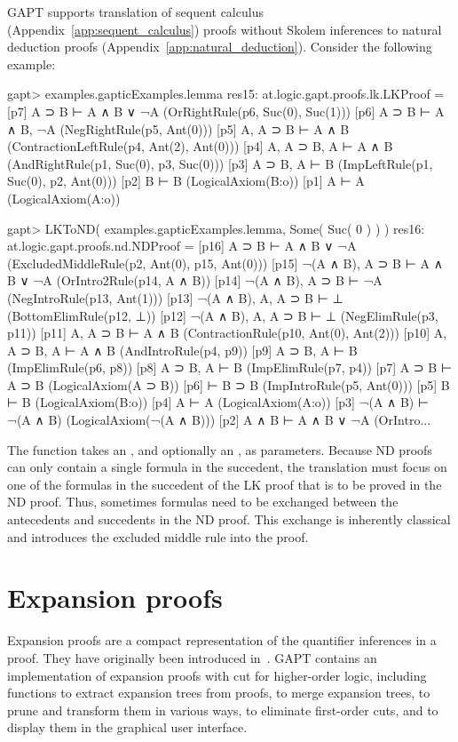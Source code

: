 \documentclass[a4paper,11pt]{book}
\newcommand{\cli}[1]{{\ttfamily {#1}}}
\begin{document}
GAPT supports translation of sequent calculus
(Appendix~\ref{app:sequent_calculus}) proofs without Skolem inferences
to natural deduction proofs (Appendix~\ref{app:natural_deduction}).
Consider the following example:
\begin{clilisting}
gapt> examples.gapticExamples.lemma
res15: at.logic.gapt.proofs.lk.LKProof =
[p7] A ⊃ B ⊢ A ∧ B ∨ ¬A    (OrRightRule(p6, Suc(0), Suc(1)))
[p6] A ⊃ B ⊢ A ∧ B, ¬A    (NegRightRule(p5, Ant(0)))
[p5] A, A ⊃ B ⊢ A ∧ B    (ContractionLeftRule(p4, Ant(2), Ant(0)))
[p4] A, A ⊃ B, A ⊢ A ∧ B    (AndRightRule(p1, Suc(0), p3, Suc(0)))
[p3] A ⊃ B, A ⊢ B    (ImpLeftRule(p1, Suc(0), p2, Ant(0)))
[p2] B ⊢ B    (LogicalAxiom(B:o))
[p1] A ⊢ A    (LogicalAxiom(A:o))

gapt> LKToND( examples.gapticExamples.lemma, Some( Suc( 0 ) ) )
res16: at.logic.gapt.proofs.nd.NDProof =
[p16] A ⊃ B ⊢ A ∧ B ∨ ¬A    (ExcludedMiddleRule(p2, Ant(0), p15, Ant(0)))
[p15] ¬(A ∧ B), A ⊃ B ⊢ A ∧ B ∨ ¬A    (OrIntro2Rule(p14, A ∧ B))
[p14] ¬(A ∧ B), A ⊃ B ⊢ ¬A    (NegIntroRule(p13, Ant(1)))
[p13] ¬(A ∧ B), A, A ⊃ B ⊢ ⊥    (BottomElimRule(p12, ⊥))
[p12] ¬(A ∧ B), A, A ⊃ B ⊢ ⊥    (NegElimRule(p3, p11))
[p11] A, A ⊃ B ⊢ A ∧ B    (ContractionRule(p10, Ant(0), Ant(2)))
[p10] A, A ⊃ B, A ⊢ A ∧ B    (AndIntroRule(p4, p9))
[p9] A ⊃ B, A ⊢ B    (ImpElimRule(p6, p8))
[p8] A ⊃ B, A ⊢ B    (ImpElimRule(p7, p4))
[p7] A ⊃ B ⊢ A ⊃ B    (LogicalAxiom(A ⊃ B))
[p6]  ⊢ B ⊃ B    (ImpIntroRule(p5, Ant(0)))
[p5] B ⊢ B    (LogicalAxiom(B:o))
[p4] A ⊢ A    (LogicalAxiom(A:o))
[p3] ¬(A ∧ B) ⊢ ¬(A ∧ B)    (LogicalAxiom(¬(A ∧ B)))
[p2] A ∧ B ⊢ A ∧ B ∨ ¬A    (OrIntro...

\end{clilisting}
The \cli{LKToND} function takes an \cli{LKProof}, and optionally an
\cli{Option[SequentIndex]}, as parameters.  Because ND proofs can only
contain a single formula in the succedent, the translation must focus on one
of the formulas in the succedent of the LK proof that is to be proved in the ND
proof.
Thus, sometimes formulas need to be exchanged between the antecedents and
succedents in the ND proof. This exchange is inherently classical and introduces
the excluded middle rule into the proof.

\section{Expansion proofs}

Expansion proofs are a compact representation of the quantifier inferences in a
proof.  They have originally been introduced in~\cite{Miller87Compact}.  GAPT
contains an implementation of expansion proofs with cut for higher-order logic,
including functions to extract expansion trees from proofs, to merge expansion
trees, to prune and transform them in various ways, to eliminate first-order
cuts, and to display them in the graphical user interface.
\end{document}
